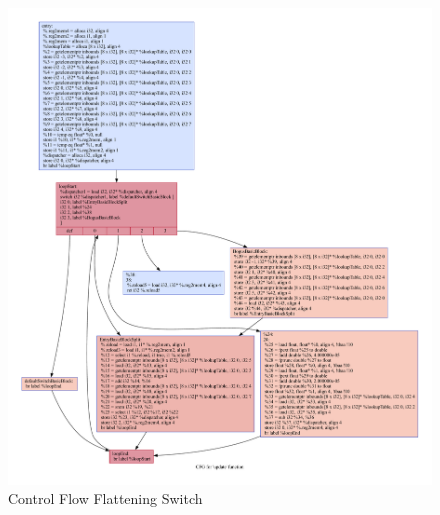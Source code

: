 \begin{figure}[t]
  \includegraphics[width=1\textwidth]{./images/update_switch.pdf}
  \caption{Control Flow Flattening Switch}
\end{figure}

